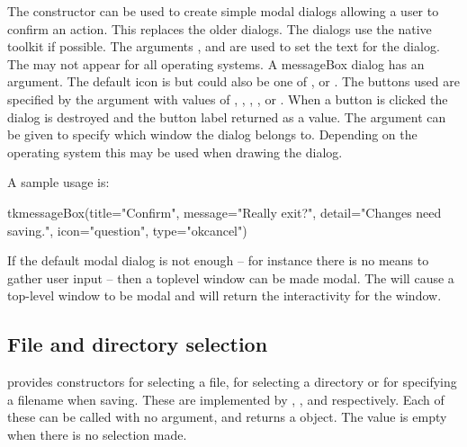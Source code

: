 The  constructor can be used to create 
simple modal dialogs allowing a user to confirm an action. This
replaces the older  dialogs. The 
dialogs use the native toolkit if possible. The arguments
,  and
 are used to set the text for the
dialog. The  may not appear for all operating systems. A
messageBox dialog has an  argument. The
default icon is  but could also be one of ,
 or . The buttons used are specified by
the  argument with values of ,
, , , or
. When a button is clicked the dialog is destroyed
and the button label returned as a value. The argument
 can be given to specify which window
the dialog belongs to. Depending on the operating system this may be
used when drawing the dialog.

A sample usage is:
\begin{Schunk}
\begin{Sinput}
 tkmessageBox(title="Confirm", message="Really exit?", 
              detail="Changes need saving.", 
              icon="question", type="okcancel")
\end{Sinput}
\end{Schunk}
If the default modal dialog is not enough -- for instance there is no
means to gather user input -- then a toplevel window can be made
modal. The  will cause a top-level window to
be modal and  will return the interactivity
for the window.



\subsection{File and directory selection}
\label{sec:file-direct-select}

\Tk\/ provides constructors for selecting a file, for selecting a
directory or for specifying a filename when saving. These are
implemented by ,
, and 
respectively. Each of these can be called with no argument, and
returns a  object. The value is empty when there is no selection made.

